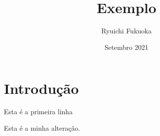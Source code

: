 \documentclass{article}
\title{Exemplo}
\author{Ryuichi Fukuoka}
\date{Setembro 2021}
\begin{document}
\maketitle

\section{Introdução}

\indent

Esta é a primeira linha

Esta é a minha alteração.
\end{document}
